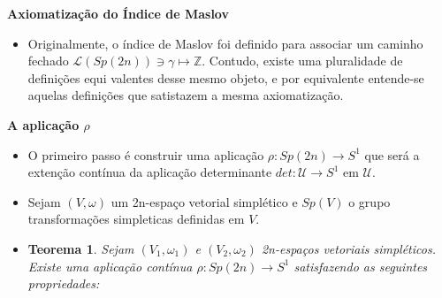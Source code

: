 \documentclass{beamer}
\newcommand{\titulo}[1]{\centering \textbf{#1}}
\newtheorem{teorema}{Teorema}[section]
\newcommand{\caminhos}{\mathcal{L}}
\newcommand{\caminhossempontobase}[1]{\caminhos(#1)}
\newcommand{\circulo}{S^{1}}
\newcommand{\gruposimpletico}[1]{Sp(#1)}
\newcommand{\inteiros}{\mathbb{Z}}
\newcommand{\matrizSimpleticaOrtogonal}{\mathcal{U}}
\begin{document}
\begin{frame}
	\titulo{Axiomatização do Índice de Maslov}
	
	\begin{itemize}
		\item 
		Originalmente, o índice de Maslov foi definido para associar um caminho fechado $\caminhossempontobase{\gruposimpletico{2n}} \ni \gamma \mapsto \inteiros$. Contudo, existe uma pluralidade de definições equi
		valentes desse mesmo objeto, e por equivalente entende-se aquelas definições que satistazem a mesma axiomatização. 
		
	\end{itemize}
	
\end{frame}

\begin{frame}
	\titulo{A aplicação $\rho$}
	\begin{itemize}
		\item O primeiro passo é construir uma aplicação $\rho: \gruposimpletico{2n}\to \circulo$ que será a extenção contínua da aplicação determinante $det:\matrizSimpleticaOrtogonal\to \circulo$ em $\matrizSimpleticaOrtogonal$.
		
		\item Sejam $(V, \omega)$ um 2n-espaço vetorial simplético e $\gruposimpletico{V}$ o grupo transformações simpleticas definidas em $V$.
		
		\item \begin{teorema}\label{teorema_aplicacao_rho}
			Sejam $(V_{1}, \omega_{1})$ e $(V_{2}, \omega_{2})$ 2n-espaços vetoriais simpléticos. Existe uma aplicação contínua $\rho:Sp(2n) \to S^{1}$ satisfazendo as seguintes propriedades:
			
		\end{teorema}
		
	\end{itemize}
\end{frame}
\end{document}
